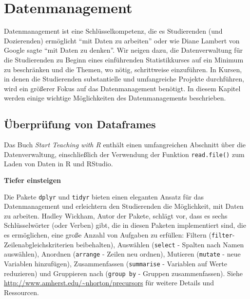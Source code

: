 \documentclass[
  ngerman,
]{scrbook}
\newenvironment{tiefereinsteigen}[1]
  {
  \begin{itemize}
  \renewcommand{\labelitemi}{
    \raisebox{2.6\height}[0pt][0pt]{
      {\setkeys{Gin}{width=7em,keepaspectratio}
        {\normalsize \textcolor{dark-fom-green}\faSearch}}
        }
  }
  \begin{blackbox}
         \bgroup\color{dark-fom-green}
          {\textbf{Tiefer einsteigen}}
        \egroup
  \item
  }
  {
  \end{blackbox}
  \end{itemize}
  }
\newenvironment{note}[1]
  {
  \begin{itemize}
  \renewcommand{\labelitemi}{
    \raisebox{-.01\height}[0pt][0pt]{
      {\setkeys{Gin}{width=7em,keepaspectratio}
        {\normalsize \textcolor{dark-fom-green}\faHashtag}}
        }
  }
  \begin{blackbox}
   \item
    }
    {
  \end{blackbox}
  \end{itemize}
  }
\begin{document}
\hypertarget{datenmanagement}{%
\chapter{Datenmanagement}\label{datenmanagement}}

Datenmanagement ist eine Schlüsselkompetenz, die es Studierenden (und Dozierenden) ermöglicht ``mit Daten zu arbeiten'' oder wie Diane Lambert von Google sagte ``mit Daten zu denken''. Wir neigen dazu, die Datenverwaltung für die Studierenden zu Beginn eines einführenden Statistikkurses auf ein Minimum zu beschränken und die Themen, wo nötig, schrittweise einzuführen. In Kursen, in denen die Studierenden substantielle und umfangreiche Projekte durchführen, wird ein größerer Fokus auf das Datenmanagement benötigt. In diesem Kapitel werden einige wichtige Möglichkeiten des Datenmanagements beschrieben.

\hypertarget{uxfcberpruxfcfung-von-dataframes}{%
\section{Überprüfung von Dataframes}\label{uxfcberpruxfcfung-von-dataframes}}

\begin{note}{note}
Das Buch \emph{Start Teaching with R} \autocite{ModelingR} enthält einen umfangreichen Abschnitt über die Datenverwaltung, einschließlich der Verwendung der Funktion \texttt{read.file()} zum Laden von Daten in \textsf{R} und \textsf{RStudio}.

\end{note}

\begin{tiefereinsteigen}{tiefereinsteigen}
Die Pakete \texttt{dplyr} und \texttt{tidyr} bieten einen eleganten Ansatz für das Datenmanagement und erleichtern den Studierenden die Möglichkeit, mit Daten zu arbeiten. Hadley Wickham, Autor der Pakete, schlägt vor, dass es sechs Schlüsselwörter (oder Verben) gibt, die in diesen Paketen implementiert sind, die es ermöglichen, eine große Anzahl von Aufgaben zu erfüllen: Filtern (\texttt{filter}- Zeilenabgleichskriterien beibehalten), Auswählen (\texttt{select} - Spalten nach Namen auswählen), Anordnen (\texttt{arrange} - Zeilen neu ordnen), Mutieren (\texttt{mutate} - neue Variablen hinzufügen), Zusammenfassen (\texttt{summarise} - Variablen auf Werte reduzieren) und Gruppieren nach (\texttt{group\ by} - Gruppen zusammenfassen). Siehe \url{http://www.amherst.edu/~nhorton/precursors} für weitere Details und Ressourcen.

\end{tiefereinsteigen}
\end{document}
